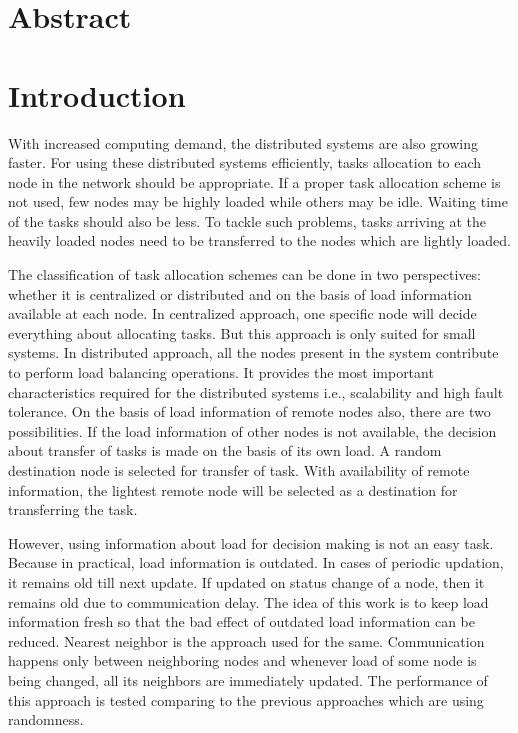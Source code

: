 \documentclass[12pt]{article}
\begin{document}
\section*{Abstract}


\clearpage
\tableofcontents
\clearpage
\listoffigures
\listoftables
\clearpage

\section{Introduction}

With increased computing demand, the distributed systems are also growing faster. For using these distributed systems efficiently, tasks allocation to each node in the network should be appropriate. If a proper task allocation scheme is not used, few nodes may be highly loaded while others may be idle. Waiting time of the tasks should also be less. To tackle such problems, tasks arriving at the heavily loaded nodes need to be transferred to the nodes which are lightly loaded.
\\
\par
	The classification of task allocation schemes can be done in two perspectives: whether it is centralized or distributed and on the basis of load information available at each node. In centralized approach, one specific node will decide everything about allocating tasks. But this approach is only suited for small systems. In distributed approach, all the nodes present in the system contribute to perform load balancing operations. It provides the most important characteristics required for the distributed systems i.e., scalability and high fault tolerance. On the basis of load information of remote nodes also, there are two possibilities. If the load information of other nodes is not available, the decision about transfer of tasks is made on the basis of its own load. A random destination node is selected for transfer of task. With availability of remote information, the lightest remote node will be selected as a destination for transferring the task.
\\
\par However, using information about load for decision making is not an easy task. Because in practical, load information is outdated. In cases of periodic updation, it remains old till next update. If updated on status change of a node, then it remains old due to communication delay. The idea of this work is to keep load information fresh so that the bad effect of outdated load information can be reduced. Nearest neighbor is the approach used for the same. Communication happens only between neighboring nodes and whenever load of some node is being changed, all its neighbors are immediately updated. The performance of this approach is tested comparing to the previous approaches which are using randomness.
\end{document}
